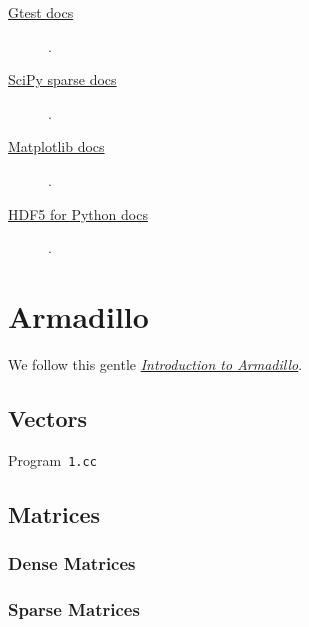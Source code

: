 \begin{description}
	\item[\href{https://google.github.io/googletest}{Gtest docs}]

	      .

	\item[\href{https://docs.scipy.org/doc/scipy/reference/sparse.html}{SciPy sparse docs}]

	      .

	\item[\href{https://matplotlib.org/stable/api/_as_gen/matplotlib.pyplot.plot.html}{Matplotlib docs}]

	      .

	\item[\href{https://docs.h5py.org/en/stable}{HDF5 for Python docs}]

	      .
\end{description}

\section{Armadillo}

We follow this gentle
\href{https://anderkve.github.io/FYS3150/book/introduction_to_cpp/intro_to_armadillo.html}{\emph{Introduction to Armadillo}}.

\subsection{Vectors}

\begin{listing}[ht!]
	\tiny
	\centering
	\caption{Program~\texttt{1.cc}}
	\label{code:1.m}
\end{listing}

\subsection{Matrices}

\subsubsection{Dense Matrices}

\subsubsection{Sparse Matrices}


